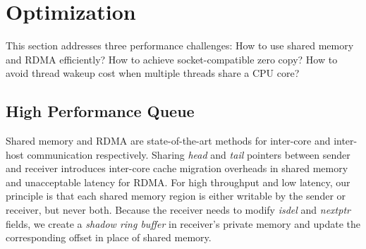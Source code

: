 \section{Optimization}
\label{sec:optimization}

This section addresses three performance challenges: How to use shared memory and RDMA efficiently? How to achieve socket-compatible zero copy? How to avoid thread wakeup cost when multiple threads share a CPU core?

\subsection{High Performance Queue}
\label{subsec:lockless-queue}

Shared memory and RDMA are state-of-the-art methods for inter-core and inter-host communication respectively.
Sharing \emph{head} and \emph{tail} pointers between sender and receiver introduces inter-core cache migration overheads in shared memory and unacceptable latency for RDMA.
For high throughput and low latency, our principle is that each shared memory region is either writable by the sender or receiver, but never both.
Because the receiver needs to modify \emph{isdel} and \emph{nextptr} fields, we create a \emph{shadow ring buffer} in receiver's private memory and update the corresponding offset in place of shared memory.


